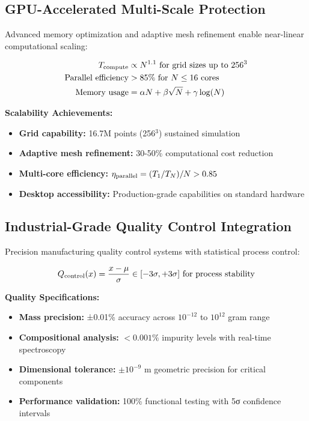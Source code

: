 \documentclass[12pt]{article}
\begin{document}
\subsection{GPU-Accelerated Multi-Scale Protection}
Advanced memory optimization and adaptive mesh refinement enable near-linear computational scaling:

\begin{align}
T_{\rm compute} &\propto N^{1.1} \text{ for grid sizes up to } 256^3 \\
\text{Parallel efficiency} &> 85\% \text{ for } N \leq 16 \text{ cores} \\
\text{Memory usage} &= \alpha N + \beta\sqrt{N} + \gamma\log(N)
\end{align}

\textbf{Scalability Achievements:}
\begin{itemize}
  \item \textbf{Grid capability:} 16.7M points (256$^3$) sustained simulation
  \item \textbf{Adaptive mesh refinement:} 30-50\% computational cost reduction
  \item \textbf{Multi-core efficiency:} $\eta_{\rm parallel} = (T_1/T_N)/N > 0.85$
  \item \textbf{Desktop accessibility:} Production-grade capabilities on standard hardware
\end{itemize}

\subsection{Industrial-Grade Quality Control Integration}
Precision manufacturing quality control systems with statistical process control:

\begin{align*}
Q_{\rm control}(x) = \frac{x - \mu}{\sigma} \in [-3\sigma, +3\sigma] \text{ for process stability}
\end{align*}

\textbf{Quality Specifications:}
\begin{itemize}
  \item \textbf{Mass precision:} ±0.01\% accuracy across $10^{-12}$ to $10^{12}$ gram range
  \item \textbf{Compositional analysis:} $<0.001\%$ impurity levels with real-time spectroscopy
  \item \textbf{Dimensional tolerance:} $\pm 10^{-9}$ m geometric precision for critical components
  \item \textbf{Performance validation:} 100\% functional testing with 5σ confidence intervals
\end{itemize}
\end{document}
